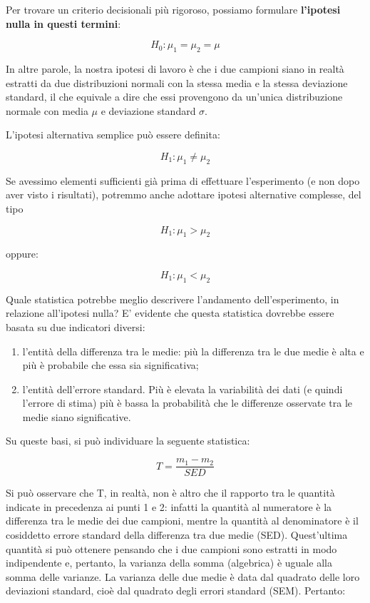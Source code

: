 \documentclass[a4paper,12pt,oneside]{book}
\providecommand{\tightlist}{%
  \setlength{\itemsep}{0pt}\setlength{\parskip}{0pt}}
\begin{document}
Per trovare un criterio decisionali più rigoroso, possiamo formulare \textbf{l'ipotesi nulla in questi termini}:

\[H_0: \mu_1 = \mu_2 = \mu\]

In altre parole, la nostra ipotesi di lavoro è che i due campioni siano in realtà estratti da due distribuzioni normali con la stessa media e la stessa deviazione standard, il che equivale a dire che essi provengono da un'unica distribuzione normale con media \(\mu\) e deviazione standard \(\sigma\).

L'ipotesi alternativa semplice può essere definita:

\[H_1 :\mu_1  \ne \mu_2\]

Se avessimo elementi sufficienti già prima di effettuare l'esperimento (e non dopo aver visto i risultati), potremmo anche adottare ipotesi alternative complesse, del tipo

\[H_1 :\mu _1  > \mu _2\]

oppure:

\[H_1 :\mu _1  < \mu _2\]

Quale statistica potrebbe meglio descrivere l'andamento dell'esperimento, in relazione all'ipotesi nulla? E' evidente che questa statistica dovrebbe essere basata su due indicatori diversi:

\begin{enumerate}
\def\labelenumi{\arabic{enumi}.}
\tightlist
\item
  l'entità della differenza tra le medie: più la differenza tra le due medie è alta e più è probabile che essa sia significativa;
\item
  l'entità dell'errore standard. Più è elevata la variabilità dei dati (e quindi l'errore di stima) più è bassa la probabilità che le differenze osservate tra le medie siano significative.
\end{enumerate}

Su queste basi, si può individuare la seguente statistica:

\[T = \frac{m_1 - m_2}{SED}\]

Si può osservare che T, in realtà, non è altro che il rapporto tra le quantità indicate in precedenza ai punti 1 e 2: infatti la quantità al numeratore è la differenza tra le medie dei due campioni, mentre la quantità al denominatore è il cosiddetto errore standard della differenza tra due medie (SED). Quest'ultima quantità si può ottenere pensando che i due campioni sono estratti in modo indipendente e, pertanto, la varianza della somma (algebrica) è uguale alla somma delle varianze. La varianza delle due medie è data dal quadrato delle loro deviazioni standard, cioè dal quadrato degli errori standard (SEM). Pertanto:
\end{document}
